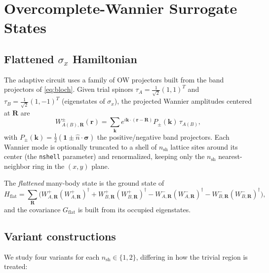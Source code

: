 \documentclass[aps,prb,twocolumn,superscriptaddress,floatfix]{revtex4-2}
\newcommand{\half}{\tfrac{1}{2}}
\newcommand{\Hflat}{H_{\mathrm{flat}}}
\begin{document}
\section{Overcomplete-Wannier Surrogate States}
\label{sec:ow}

\subsection{Flattened $\sigma_x$ Hamiltonian}

The adaptive circuit uses a family of OW projectors built from the
band projectors of \eqref{eq:bloch}.  Given trial spinors
$\tau_A = \frac{1}{\sqrt{2}}(1,1)^T$ and
$\tau_B = \frac{1}{\sqrt{2}}(1,-1)^T$ (eigenstates of $\sigma_x$),
the projected Wannier amplitudes centered at $\mathbf{R}$ are
\begin{equation}
  W^{\pm}_{A(B),\mathbf{R}}(\mathbf{r}) =
    \sum_{\mathbf{k}} e^{i\mathbf{k}\cdot(\mathbf{r}-\mathbf{R})}
    P_\pm(\mathbf{k})\,\tau_{A(B)},
\end{equation}
with $P_\pm(\mathbf{k}) = \half(\mathbf{1} \pm \hat{n}\cdot\bm{\sigma})$ the
positive/negative band projectors.  Each Wannier mode is optionally truncated
to a shell of $n_\mathrm{sh}$ lattice sites around its center (the
\texttt{nshell} parameter) and renormalized, keeping only the $n_\mathrm{sh}$
nearest-neighbor ring in the $(x,y)$ plane.

The \emph{flattened} many-body state is the ground state of
\begin{equation}
  \Hflat = \sum_{\mathbf{R}}
           \bigl(
             W^+_{A,\mathbf{R}} (W^+_{A,\mathbf{R}})^\dagger
           + W^+_{B,\mathbf{R}} (W^+_{B,\mathbf{R}})^\dagger
           - W^-_{A,\mathbf{R}} (W^-_{A,\mathbf{R}})^\dagger
           - W^-_{B,\mathbf{R}} (W^-_{B,\mathbf{R}})^\dagger
           \bigr),
  \label{eq:Hflat}
\end{equation}
and the covariance $G_{\mathrm{flat}}$ is built from its occupied eigenstates.

\subsection{Variant constructions}

We study four variants for each $n_\mathrm{sh} \in \{1, 2\}$, differing in
how the trivial region is treated:
\end{document}
